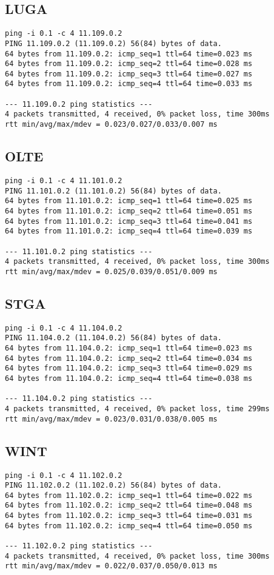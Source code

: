 \subsection{LUGA}
\begin{lstlisting}
ping -i 0.1 -c 4 11.109.0.2
PING 11.109.0.2 (11.109.0.2) 56(84) bytes of data.
64 bytes from 11.109.0.2: icmp_seq=1 ttl=64 time=0.023 ms
64 bytes from 11.109.0.2: icmp_seq=2 ttl=64 time=0.028 ms
64 bytes from 11.109.0.2: icmp_seq=3 ttl=64 time=0.027 ms
64 bytes from 11.109.0.2: icmp_seq=4 ttl=64 time=0.033 ms

--- 11.109.0.2 ping statistics ---
4 packets transmitted, 4 received, 0% packet loss, time 300ms
rtt min/avg/max/mdev = 0.023/0.027/0.033/0.007 ms
\end{lstlisting}

\subsection{OLTE}
\begin{lstlisting}
ping -i 0.1 -c 4 11.101.0.2
PING 11.101.0.2 (11.101.0.2) 56(84) bytes of data.
64 bytes from 11.101.0.2: icmp_seq=1 ttl=64 time=0.025 ms
64 bytes from 11.101.0.2: icmp_seq=2 ttl=64 time=0.051 ms
64 bytes from 11.101.0.2: icmp_seq=3 ttl=64 time=0.041 ms
64 bytes from 11.101.0.2: icmp_seq=4 ttl=64 time=0.039 ms

--- 11.101.0.2 ping statistics ---
4 packets transmitted, 4 received, 0% packet loss, time 300ms
rtt min/avg/max/mdev = 0.025/0.039/0.051/0.009 ms
\end{lstlisting}

\subsection{STGA}
\begin{lstlisting}
ping -i 0.1 -c 4 11.104.0.2
PING 11.104.0.2 (11.104.0.2) 56(84) bytes of data.
64 bytes from 11.104.0.2: icmp_seq=1 ttl=64 time=0.023 ms
64 bytes from 11.104.0.2: icmp_seq=2 ttl=64 time=0.034 ms
64 bytes from 11.104.0.2: icmp_seq=3 ttl=64 time=0.029 ms
64 bytes from 11.104.0.2: icmp_seq=4 ttl=64 time=0.038 ms

--- 11.104.0.2 ping statistics ---
4 packets transmitted, 4 received, 0% packet loss, time 299ms
rtt min/avg/max/mdev = 0.023/0.031/0.038/0.005 ms
\end{lstlisting}

\subsection{WINT}
\begin{lstlisting}
ping -i 0.1 -c 4 11.102.0.2
PING 11.102.0.2 (11.102.0.2) 56(84) bytes of data.
64 bytes from 11.102.0.2: icmp_seq=1 ttl=64 time=0.022 ms
64 bytes from 11.102.0.2: icmp_seq=2 ttl=64 time=0.048 ms
64 bytes from 11.102.0.2: icmp_seq=3 ttl=64 time=0.031 ms
64 bytes from 11.102.0.2: icmp_seq=4 ttl=64 time=0.050 ms

--- 11.102.0.2 ping statistics ---
4 packets transmitted, 4 received, 0% packet loss, time 300ms
rtt min/avg/max/mdev = 0.022/0.037/0.050/0.013 ms
\end{lstlisting}

